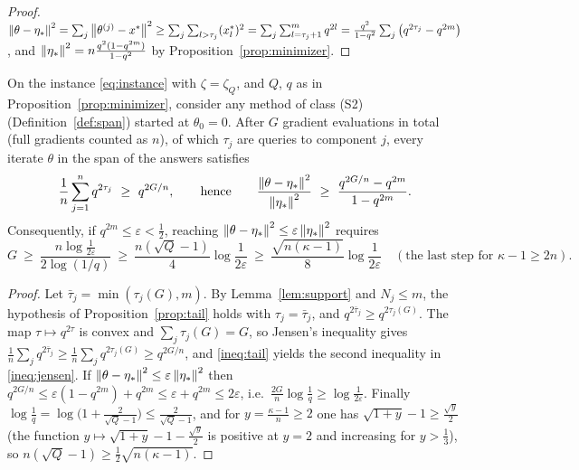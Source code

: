\begin{proof}
$\left\|\theta-\eta_\ast\right\|^2=\sum_j\left\|\theta^{(j)}-x^\ast\right\|^2\ge\sum_j\sum_{l>\tau_j}(x^\ast_l)^2=\sum_j\sum_{l=\tau_j+1}^mq^{2l}=\frac{q^2}{1-q^2}\sum_j\big(q^{2\tau_j}-q^{2m}\big)$, and $\left\|\eta_\ast\right\|^2=n\frac{q^2(1-q^{2m})}{1-q^2}$ by Proposition~\ref{prop:minimizer}.
\end{proof}

\begin{proposition}
\label{prop:anyseq}
On the instance \eqref{eq:instance} with $\zeta=\zeta_Q$, and $Q$, $q$ as in Proposition~\ref{prop:minimizer}, consider any method of class (S2) (Definition~\ref{def:span}) started at $\theta_0=0$. After $G$ gradient evaluations in total (full gradients counted as $n$), of which $\tau_j$ are queries to component $j$, every iterate $\theta$ in the span of the answers satisfies
\begin{equation}
\label{ineq:jensen}
\frac1n\sum_{j=1}^nq^{2\tau_j}\ \ge\ q^{2G/n},\qquad\text{hence}\qquad
\frac{\norm{\theta-\etastar}^2}{\norm{\etastar}^2}\ \ge\ \frac{q^{2G/n}-q^{2m}}{1-q^{2m}} .
\end{equation}
Consequently, if $q^{2m}\le\varepsilon<\frac12$, reaching $\left\|\theta-\eta_\ast\right\|^2\le\varepsilon\left\|\eta_\ast\right\|^2$ requires
\begin{equation}
\label{eq:anyseqcount}
G\ \ge\ \frac{n\log\frac1{2\varepsilon}}{2\log(1/q)}\ \ge\ \frac{n(\sqrt Q-1)}{4}\log\frac1{2\varepsilon}\ \ge\ \frac{\sqrt{n(\kappa-1)}}{8}\log\frac1{2\varepsilon}\quad(\text{the last step for }\kappa-1\ge2n).
\end{equation}
\end{proposition}

\begin{proof}
Let $\bar\tau_j=\min(\tau_j(G),m)$. By Lemma~\ref{lem:support} and $N_j\le m$, the hypothesis of Proposition~\ref{prop:tail} holds with $\tau_j=\bar\tau_j$, and $q^{2\bar\tau_j}\ge q^{2\tau_j(G)}$. The map $\tau\mapsto q^{2\tau}$ is convex and $\sum_j\tau_j(G)=G$, so Jensen's inequality gives $\frac1n\sum_jq^{2\bar\tau_j}\ge\frac1n\sum_jq^{2\tau_j(G)}\ge q^{2G/n}$, and \eqref{ineq:tail} yields the second inequality in \eqref{ineq:jensen}. If $\left\|\theta-\eta_\ast\right\|^2\le\varepsilon\left\|\eta_\ast\right\|^2$ then $q^{2G/n}\le\varepsilon(1-q^{2m})+q^{2m}\le\varepsilon+q^{2m}\le2\varepsilon$, i.e.\ $\frac{2G}n\log\frac1q\ge\log\frac1{2\varepsilon}$. Finally $\log\frac1q=\log\big(1+\frac2{\sqrt Q-1}\big)\le\frac2{\sqrt Q-1}$, and for $y=\frac{\kappa-1}n\ge2$ one has $\sqrt{1+y}-1\ge\frac{\sqrt y}2$ (the function $y\mapsto\sqrt{1+y}-1-\frac{\sqrt y}2$ is positive at $y=2$ and increasing for $y>\frac13$), so $n(\sqrt Q-1)\ge\frac12\sqrt{n(\kappa-1)}$.
\end{proof}

